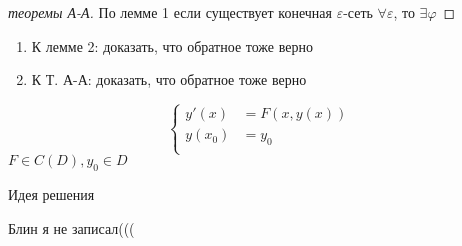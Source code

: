 \begin{proof}[теоремы А-А]\thmslashn
	
	По лемме 1 если существует конечная $\varepsilon$-сеть $\forall \varepsilon$, то $\exists \varphi$
	
\end{proof}

\begin{exerc}\thmslashn
	\begin{enumerate}
		\item 
		К лемме 2: доказать, что обратное тоже верно

		\item
		К Т. А-А: доказать, что обратное тоже верно

	\end{enumerate}
\end{exerc}

\begin{remark_author}\thmslashn
	\[
	\begin{cases}
		y'(x) &= F(x, y(x))\\
		y(x_0)&= y_0\\
	\end{cases}
	\]
	$F\in C(D), y_0\in D$

	Идея решения
	
	\TODO Блин я не записал(((

\end{remark_author}


